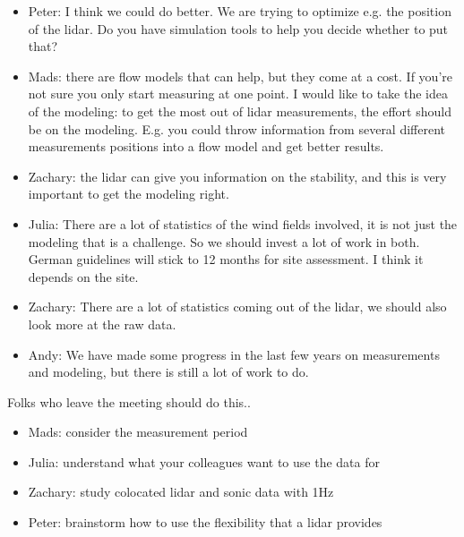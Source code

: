 \begin{itemize}
\item  Peter: I think we could do better. We are trying to optimize e.g. the position of the lidar. Do you have simulation tools to help you decide whether to put that?
\item  Mads: there are flow models that can help, but they come at a cost. If you're not sure you only start measuring at one point. I would like to take the idea of the modeling: to get the most out of lidar measurements, the effort should be on the modeling. E.g. you could throw information from several different measurements positions into a flow model and get better results.
\item  Zachary: the lidar can give you information on the stability, and this   is very important to get the modeling right.
\item  Julia: There are a lot of statistics of the wind fields involved, it is not just the modeling that is a challenge. So we should invest a lot of work in both. German guidelines will stick to 12 months for site assessment. I think it depends on the site. 
\item  Zachary: There are a lot of statistics coming out of the lidar, we should also look more at the raw data.
\item  Andy: We have made some progress in the last few years on measurements and modeling, but there is still a lot of work to do.
\end{itemize}

Folks who leave the meeting should do this..

\begin{itemize}
\item  Mads: consider the measurement period
\item  Julia: understand what your colleagues want to use the data for
\item  Zachary: study colocated lidar and sonic data with 1Hz
\item  Peter: brainstorm how to use the flexibility that a lidar provides
\end{itemize}